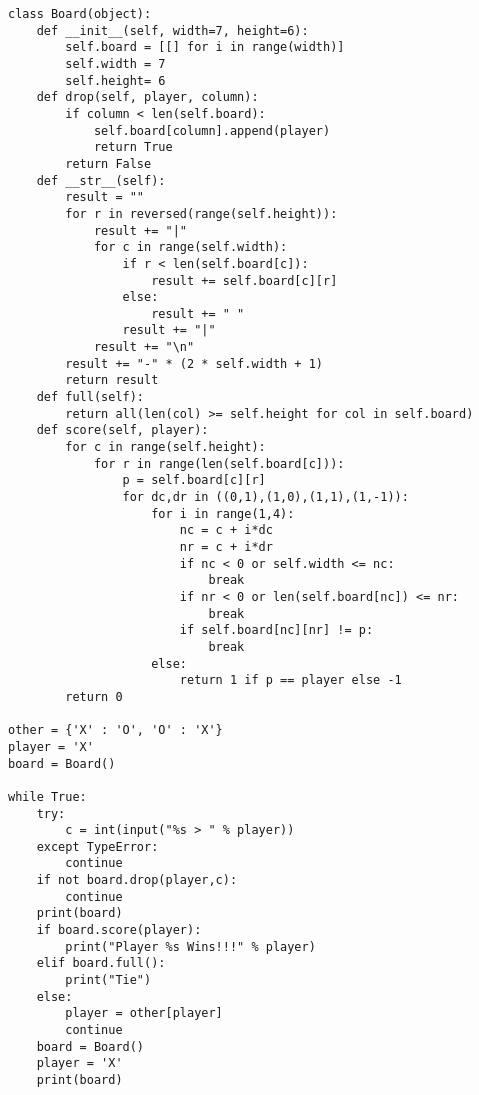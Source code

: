 \documentclass{article}
\begin{document}
{\begin{verbatim}
class Board(object):
    def __init__(self, width=7, height=6):
        self.board = [[] for i in range(width)]
        self.width = 7
        self.height= 6
    def drop(self, player, column):
        if column < len(self.board):
            self.board[column].append(player)
            return True
        return False
    def __str__(self):
        result = ""
        for r in reversed(range(self.height)):
            result += "|"
            for c in range(self.width):
                if r < len(self.board[c]):
                    result += self.board[c][r]
                else:
                    result += " "
                result += "|"
            result += "\n"
        result += "-" * (2 * self.width + 1)
        return result
    def full(self):
        return all(len(col) >= self.height for col in self.board)
    def score(self, player):
        for c in range(self.height):
            for r in range(len(self.board[c])):
                p = self.board[c][r]
                for dc,dr in ((0,1),(1,0),(1,1),(1,-1)):
                    for i in range(1,4):
                        nc = c + i*dc
                        nr = c + i*dr
                        if nc < 0 or self.width <= nc:
                            break
                        if nr < 0 or len(self.board[nc]) <= nr:
                            break
                        if self.board[nc][nr] != p:
                            break
                    else:
                        return 1 if p == player else -1
        return 0

other = {'X' : 'O', 'O' : 'X'}
player = 'X'
board = Board()

while True:
    try:
        c = int(input("%s > " % player))
    except TypeError:
        continue
    if not board.drop(player,c):
        continue
    print(board)
    if board.score(player):
        print("Player %s Wins!!!" % player)
    elif board.full():
        print("Tie")
    else:
        player = other[player]
        continue
    board = Board()
    player = 'X'
    print(board)
\end{verbatim}
}
\end{document}

